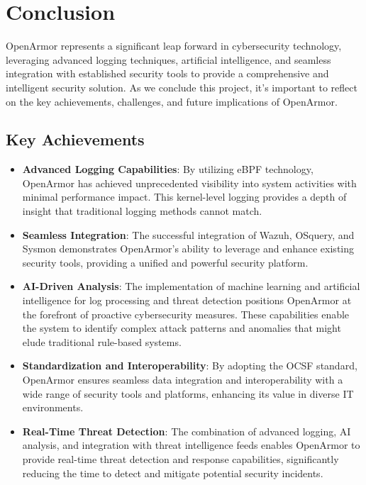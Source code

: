 \chapter{Conclusion}

OpenArmor represents a significant leap forward in cybersecurity technology, leveraging advanced logging techniques, artificial intelligence, and seamless integration with established security tools to provide a comprehensive and intelligent security solution. As we conclude this project, it's important to reflect on the key achievements, challenges, and future implications of OpenArmor.

\section{Key Achievements}

\begin{itemize}
    \item \textbf{Advanced Logging Capabilities}: By utilizing eBPF technology, OpenArmor has achieved unprecedented visibility into system activities with minimal performance impact. This kernel-level logging provides a depth of insight that traditional logging methods cannot match.
    
    \item \textbf{Seamless Integration}: The successful integration of Wazuh, OSquery, and Sysmon demonstrates OpenArmor's ability to leverage and enhance existing security tools, providing a unified and powerful security platform.
    
    \item \textbf{AI-Driven Analysis}: The implementation of machine learning and artificial intelligence for log processing and threat detection positions OpenArmor at the forefront of proactive cybersecurity measures. These capabilities enable the system to identify complex attack patterns and anomalies that might elude traditional rule-based systems.
    
    \item \textbf{Standardization and Interoperability}: By adopting the OCSF standard, OpenArmor ensures seamless data integration and interoperability with a wide range of security tools and platforms, enhancing its value in diverse IT environments.
    
    \item \textbf{Real-Time Threat Detection}: The combination of advanced logging, AI analysis, and integration with threat intelligence feeds enables OpenArmor to provide real-time threat detection and response capabilities, significantly reducing the time to detect and mitigate potential security incidents.
\end{itemize}

